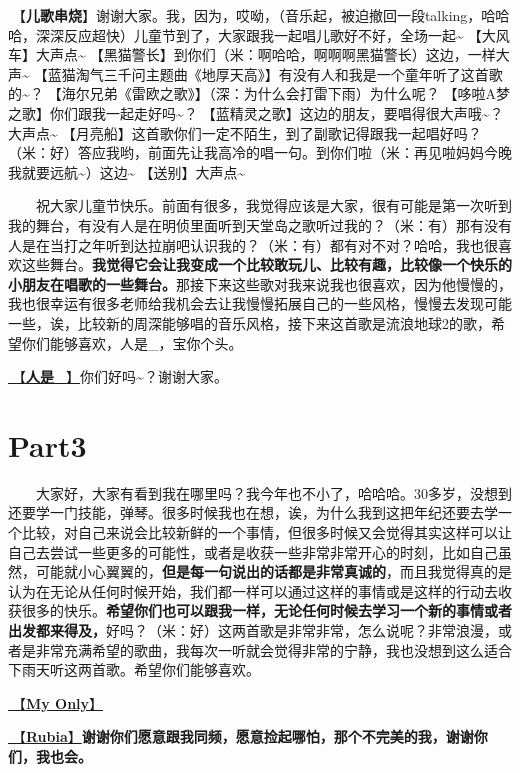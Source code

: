\documentclass[]{ctexbook}
\begin{document}
🎵【\textbf{儿歌串烧}】谢谢大家。我，因为，哎呦，（音乐起，被迫撤回一段talking，哈哈哈，深深反应超快）儿童节到了，大家跟我一起唱儿歌好不好，全场一起\textasciitilde🎵【大风车】大声点\textasciitilde🎵【黑猫警长】到你们（米：啊哈哈，啊啊啊黑猫警长）这边，一样大声\textasciitilde🎵【蓝猫淘气三千问主题曲《地厚天高》】有没有人和我是一个童年听了这首歌的\textasciitilde？🎵【海尔兄弟《雷欧之歌》】（深：为什么会打雷下雨）为什么呢？🎵【哆啦A梦之歌】你们跟我一起走好吗\textasciitilde？🎵【蓝精灵之歌】这边的朋友，要唱得很大声哦\textasciitilde？大声点\textasciitilde🎵【月亮船】这首歌你们一定不陌生，到了副歌记得跟我一起唱好吗？（米：好）答应我哟，前面先让我高冷的唱一句。到你们啦（米：再见啦妈妈今晚我就要远航\textasciitilde）这边\textasciitilde🎵【送别】大声点\textasciitilde{}

  祝大家儿童节快乐。前面有很多，我觉得应该是大家，很有可能是第一次听到我的舞台，有没有人是在明侦里面听到天堂岛之歌听过我的？（米：有）那有没有人是在当打之年听到达拉崩吧认识我的？（米：有）都有对不对？哈哈，我也很喜欢这些舞台。\textbf{我觉得它会让我变成一个比较敢玩儿、比较有趣，比较像一个快乐的小朋友在唱歌的一些舞台。}那接下来这些歌对我来说我也很喜欢，因为他慢慢的，我也很幸运有很多老师给我机会去让我慢慢拓展自己的一些风格，慢慢去发现可能一些，诶，比较新的周深能够唱的音乐风格，接下来这首歌是流浪地球2的歌，希望你们能够喜欢，人是\_，宝你个头。

\hyperref[renshi]{🎵【\textbf{人是\_}】}你们好吗\textasciitilde？谢谢大家。

\section{Part3}\label{shenzhen-20240601-part3}

  大家好，大家有看到我在哪里吗？我今年也不小了，哈哈哈。30多岁，没想到还要学一门技能，弹琴。很多时候我也在想，诶，为什么我到这把年纪还要去学一个比较，对自己来说会比较新鲜的一个事情，但很多时候又会觉得其实这样可以让自己去尝试一些更多的可能性，或者是收获一些非常非常开心的时刻，比如自己虽然，可能就小心翼翼的，\textbf{但是每一句说出的话都是非常真诚的}，而且我觉得真的是认为在无论从任何时候开始，我们都一样可以通过这样的事情或是这样的行动去收获很多的快乐。\textbf{希望你们也可以跟我一样，无论任何时候去学习一个新的事情或者出发都来得及，}好吗？（米：好）这两首歌是非常非常，怎么说呢？非常浪漫，或者是非常充满希望的歌曲，我每次一听就会觉得非常的宁静，我也没想到这么适合下雨天听这两首歌。希望你们能够喜欢。

\hyperref[my-only]{🎵【\textbf{My Only}】}

\hyperref[rubia]{🎵【\textbf{Rubia}】}\textbf{谢谢你们愿意跟我同频，愿意捡起哪怕，那个不完美的我，谢谢你们，我也会。}
\end{document}
